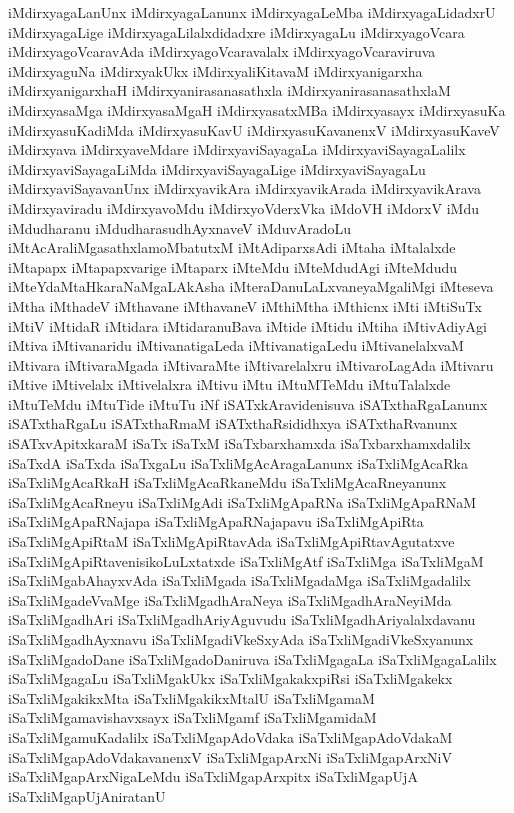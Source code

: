 {iMdirxyagaLanUnx
iMdirxyagaLanunx
iMdirxyagaLeMba
iMdirxyagaLidadxrU
iMdirxyagaLige
iMdirxyagaLilalxdidadxre
iMdirxyagaLu
iMdirxyagoVcara
iMdirxyagoVcaravAda
iMdirxyagoVcaravalalx
iMdirxyagoVcaraviruva
iMdirxyaguNa
iMdirxyakUkx
iMdirxyaliKitavaM
iMdirxyanigarxha
iMdirxyanigarxhaH
iMdirxyanirasanasathxla
iMdirxyanirasanasathxlaM
iMdirxyasaMga
iMdirxyasaMgaH
iMdirxyasatxMBa
iMdirxyasayx
iMdirxyasuKa
iMdirxyasuKadiMda
iMdirxyasuKavU
iMdirxyasuKavanenxV
iMdirxyasuKaveV
iMdirxyava
iMdirxyaveMdare
iMdirxyaviSayagaLa
iMdirxyaviSayagaLalilx
iMdirxyaviSayagaLiMda
iMdirxyaviSayagaLige
iMdirxyaviSayagaLu
iMdirxyaviSayavanUnx
iMdirxyavikAra
iMdirxyavikArada
iMdirxyavikArava
iMdirxyaviradu
iMdirxyavoMdu
iMdirxyoVderxVka
iMdoVH
iMdorxV
iMdu
iMdudharanu
iMdudharasudhAyxnaveV
iMduvAradoLu
iMtAcAraliMgasathxlamoMbatutxM
iMtAdiparxsAdi
iMtaha
iMtalalxde
iMtapapx
iMtapapxvarige
iMtaparx
iMteMdu
iMteMdudAgi
iMteMdudu
iMteYdaMtaHkaraNaMgaLAkAsha
iMteraDanuLaLxvaneyaMgaliMgi
iMteseva
iMtha
iMthadeV
iMthavane
iMthavaneV
iMthiMtha
iMthicnx
iMti
iMtiSuTx
iMtiV
iMtidaR
iMtidara
iMtidaranuBava
iMtide
iMtidu
iMtiha
iMtivAdiyAgi
iMtiva
iMtivanaridu
iMtivanatigaLeda
iMtivanatigaLedu
iMtivanelalxvaM
iMtivara
iMtivaraMgada
iMtivaraMte
iMtivarelalxru
iMtivaroLagAda
iMtivaru
iMtive
iMtivelalx
iMtivelalxra
iMtivu
iMtu
iMtuMTeMdu
iMtuTalalxde
iMtuTeMdu
iMtuTide
iMtuTu
iNf
iSATxkAravidenisuva
iSATxthaRgaLanunx
iSATxthaRgaLu
iSATxthaRmaM
iSATxthaRsididhxya
iSATxthaRvanunx
iSATxvApitxkaraM
iSaTx
iSaTxM
iSaTxbarxhamxda
iSaTxbarxhamxdalilx
iSaTxdA
iSaTxda
iSaTxgaLu
iSaTxliMgAcAragaLanunx
iSaTxliMgAcaRka
iSaTxliMgAcaRkaH
iSaTxliMgAcaRkaneMdu
iSaTxliMgAcaRneyanunx
iSaTxliMgAcaRneyu
iSaTxliMgAdi
iSaTxliMgApaRNa
iSaTxliMgApaRNaM
iSaTxliMgApaRNajapa
iSaTxliMgApaRNajapavu
iSaTxliMgApiRta
iSaTxliMgApiRtaM
iSaTxliMgApiRtavAda
iSaTxliMgApiRtavAgutatxve
iSaTxliMgApiRtavenisikoLuLxtatxde
iSaTxliMgAtf
iSaTxliMga
iSaTxliMgaM
iSaTxliMgabAhayxvAda
iSaTxliMgada
iSaTxliMgadaMga
iSaTxliMgadalilx
iSaTxliMgadeVvaMge
iSaTxliMgadhAraNeya
iSaTxliMgadhAraNeyiMda
iSaTxliMgadhAri
iSaTxliMgadhAriyAguvudu
iSaTxliMgadhAriyalalxdavanu
iSaTxliMgadhAyxnavu
iSaTxliMgadiVkeSxyAda
iSaTxliMgadiVkeSxyanunx
iSaTxliMgadoDane
iSaTxliMgadoDaniruva
iSaTxliMgagaLa
iSaTxliMgagaLalilx
iSaTxliMgagaLu
iSaTxliMgakUkx
iSaTxliMgakakxpiRsi
iSaTxliMgakekx
iSaTxliMgakikxMta
iSaTxliMgakikxMtalU
iSaTxliMgamaM
iSaTxliMgamavishavxsayx
iSaTxliMgamf
iSaTxliMgamidaM
iSaTxliMgamuKadalilx
iSaTxliMgapAdoVdaka
iSaTxliMgapAdoVdakaM
iSaTxliMgapAdoVdakavanenxV
iSaTxliMgapArxNi
iSaTxliMgapArxNiV
iSaTxliMgapArxNigaLeMdu
iSaTxliMgapArxpitx
iSaTxliMgapUjA
iSaTxliMgapUjAniratanU
}
